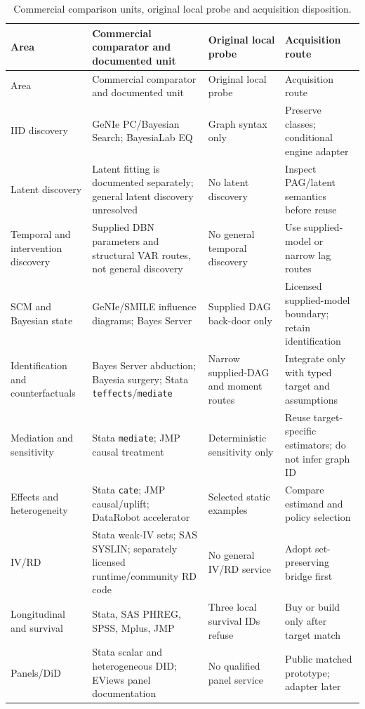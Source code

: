 \begingroup\small
\begin{longtable}{@{}P{.18\linewidth}P{.29\linewidth}P{.21\linewidth}P{.23\linewidth}@{}}
\caption{Commercial comparison units, original local probe and acquisition disposition.}
\label{exec17:s8-coverage-table}\\
\toprule
Area & Commercial comparator and documented unit & Original local probe & Acquisition route \\
\midrule
\endfirsthead
\toprule
Area & Commercial comparator and documented unit & Original local probe & Acquisition route \\
\midrule
\endhead
IID discovery & GeNIe PC/Bayesian Search; BayesiaLab EQ & Graph syntax only & Preserve classes; conditional engine adapter \\
Latent discovery & Latent fitting is documented separately; general latent discovery unresolved & No latent discovery & Inspect PAG/latent semantics before reuse \\
Temporal and intervention discovery & Supplied DBN parameters and structural VAR routes, not general discovery & No general temporal discovery & Use supplied-model or narrow lag routes \\
SCM and Bayesian state & GeNIe/SMILE influence diagrams; Bayes Server & Supplied DAG back-door only & Licensed supplied-model boundary; retain identification \\
Identification and counterfactuals & Bayes Server abduction; Bayesia surgery; Stata \texttt{teffects}/\texttt{mediate} & Narrow supplied-DAG and moment routes & Integrate only with typed target and assumptions \\
Mediation and sensitivity & Stata \texttt{mediate}; JMP causal treatment & Deterministic sensitivity only & Reuse target-specific estimators; do not infer graph ID \\
Effects and heterogeneity & Stata \texttt{cate}; JMP causal/uplift; DataRobot accelerator & Selected static examples & Compare estimand and policy selection \\
IV/RD & Stata weak-IV sets; SAS SYSLIN; separately licensed runtime/community RD code & No general IV/RD service & Adopt set-preserving bridge first \\
Longitudinal and survival & Stata, SAS PHREG, SPSS, Mplus, JMP & Three local survival IDs refuse & Buy or build only after target match \\
Panels/DiD & Stata scalar and heterogeneous DID; EViews panel documentation & No qualified panel service & Public matched prototype; adapter later \\

\end{longtable}
